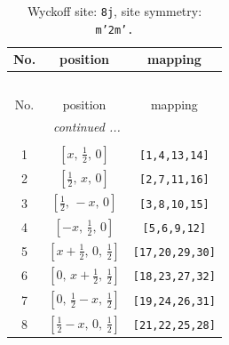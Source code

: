 \documentclass[fleqn,8pt]{jsarticle}
\begin{document}
\begin{longtable}{ccc}
\caption{Wyckoff site: {\tt 8j}, site symmetry: {\tt m'2m'.}}
 \\
 \hline \hline
No. & position & mapping \\ \hline \endfirsthead

\multicolumn{2}{l}{\tablename\ \thetable{}} \\
 \hline \hline
No. & position & mapping \\ \hline \endhead

 \hline \hline
\multicolumn{2}{r}{\footnotesize\it continued ...} \\ \endfoot

 \hline \hline
\multicolumn{2}{r}{} \\ \endlastfoot

1 & $\left[ x,\, \frac{1}{2},\, 0 \right]$ & {\tt [1,4,13,14]} \\ \hline
2 & $\left[ \frac{1}{2},\, x,\, 0 \right]$ & {\tt [2,7,11,16]} \\ \hline
3 & $\left[ \frac{1}{2},\, - x,\, 0 \right]$ & {\tt [3,8,10,15]} \\ \hline
4 & $\left[ - x,\, \frac{1}{2},\, 0 \right]$ & {\tt [5,6,9,12]} \\ \hline
5 & $\left[ x + \frac{1}{2},\, 0,\, \frac{1}{2} \right]$ & {\tt [17,20,29,30]} \\ \hline
6 & $\left[ 0,\, x + \frac{1}{2},\, \frac{1}{2} \right]$ & {\tt [18,23,27,32]} \\ \hline
7 & $\left[ 0,\, \frac{1}{2} - x,\, \frac{1}{2} \right]$ & {\tt [19,24,26,31]} \\ \hline
8 & $\left[ \frac{1}{2} - x,\, 0,\, \frac{1}{2} \right]$ & {\tt [21,22,25,28]} \\
\end{longtable}
\renewcommand{\arraystretch}{1.2}
\end{document}
